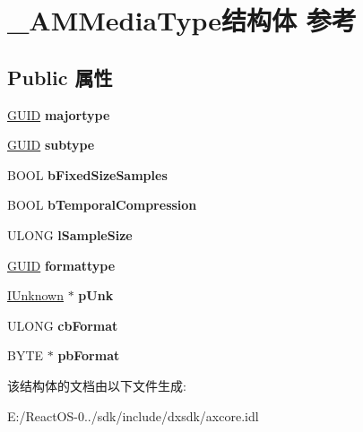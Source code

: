\hypertarget{struct___a_m_media_type}{}\section{\+\_\+\+A\+M\+Media\+Type结构体 参考}
\label{struct___a_m_media_type}
\subsection*{Public 属性}
\begin{DoxyCompactItemize}
\item 
\mbox{\label{struct___a_m_media_type_a38798f2f287ab84ef701653e9f25b092}} 
\hyperlink{interface_g_u_i_d}{G\+U\+ID} {\bfseries majortype}
\item 
\mbox{\label{struct___a_m_media_type_a182bbcf95bbad5c0d8e8201e0eef13e3}} 
\hyperlink{interface_g_u_i_d}{G\+U\+ID} {\bfseries subtype}
\item 
\mbox{\label{struct___a_m_media_type_ae7714f732646ffd2f773f1519ba2c8b5}} 
B\+O\+OL {\bfseries b\+Fixed\+Size\+Samples}
\item 
\mbox{\label{struct___a_m_media_type_a734368cd02f4448961fdf20bb16ed2a5}} 
B\+O\+OL {\bfseries b\+Temporal\+Compression}
\item 
\mbox{\label{struct___a_m_media_type_adaf922e2bc7718b6f9871471c5eba006}} 
U\+L\+O\+NG {\bfseries l\+Sample\+Size}
\item 
\mbox{\label{struct___a_m_media_type_ad4908378cfcf2e00c972627478071ec8}} 
\hyperlink{interface_g_u_i_d}{G\+U\+ID} {\bfseries formattype}
\item 
\mbox{\label{struct___a_m_media_type_a5ef10cf6dfcfd7e48506d53123d35e7f}} 
\hyperlink{interface_i_unknown}{I\+Unknown} $\ast$ {\bfseries p\+Unk}
\item 
\mbox{\label{struct___a_m_media_type_a24157c959d8f811ece4d7b304367a488}} 
U\+L\+O\+NG {\bfseries cb\+Format}
\item 
\mbox{\label{struct___a_m_media_type_ad1a354efe7c1d3a470152416eee9d57a}} 
B\+Y\+TE $\ast$ {\bfseries pb\+Format}
\end{DoxyCompactItemize}


该结构体的文档由以下文件生成\+:\begin{DoxyCompactItemize}
\item 
E\+:/\+React\+O\+S-\/0../sdk/include/dxsdk/axcore.\+idl\end{DoxyCompactItemize}
